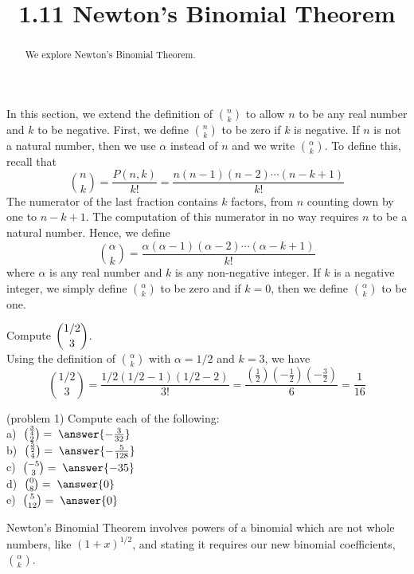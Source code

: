 \documentclass[handout]{ximera}
\title{1.11 Newton's Binomial Theorem}
\begin{document}
\begin{abstract}
We explore Newton's Binomial Theorem.
\end{abstract}

\maketitle


In this section, we extend the definition of $\binom{n}{k}$ to allow $n$ to be any real number and $k$ to be negative.
First, we define $\binom{n}{k}$ to be zero if $k$ is negative. If $n$ is not a natural number, 
then we use $\alpha$ instead of $n$ and we write $\binom{\alpha}{k}$.  To define this, recall that 
\[
\binom{n}{k} = \frac{P(n,k)}{k!} = \frac{n(n-1)(n-2)\cdots(n-k+1)}{k!}
\]
The numerator of the last fraction contains $k$ factors, from $n$ counting down by one to $n-k+1$. 
The computation of this numerator in no way requires $n$ to be a natural number.
Hence, we define 
\[
\binom{\alpha}{k} = \frac{\alpha(\alpha - 1)(\alpha - 2)\cdots(\alpha - k+1)}{k!}
\]
where $\alpha$ is any real number and $k$ is any non-negative integer. If $k$ is a negative integer, we simply define 
$\binom{\alpha}{k}$ to be zero and if $k = 0$, then we define $\binom{\alpha}{k}$ to be one.

\begin{example}[example 1] 
Compute $\displaystyle \binom{1/2}{3}$.\\
Using the definition of $\binom{\alpha}{k}$ with $\alpha = 1/2$ and $k = 3$, we have
\[
\binom{1/2}{3} = \frac{1/2(1/2 -1)(1/2 -2)}{3!} = \frac{\left(\frac12\right) \left(-\frac12\right)\left(-\frac32\right)}{6} = \frac{1}{16}
\]
\end{example}

\begin{problem}(problem 1) Compute each of the following:\\
a) $\; \binom{\frac34}{2} = \; \answer{-\frac{3}{32}}$\\
b) $\; \binom{\frac52}{4} = \; \answer{-\frac{5}{128}}$\\
c) $\; \binom{-5}{3} = \; \answer{-35}$\\
d) $\; \binom{0}{8} = \; \answer{0}$\\
e) $\; \binom{5}{12} = \; \answer{0}$
\end{problem}

Newton's Binomial Theorem involves powers of a binomial which are not whole numbers, like $(1+x)^{1/2}$, and stating it requires our new binomial coefficients, $\binom{\alpha}{k}$.
\end{document}
